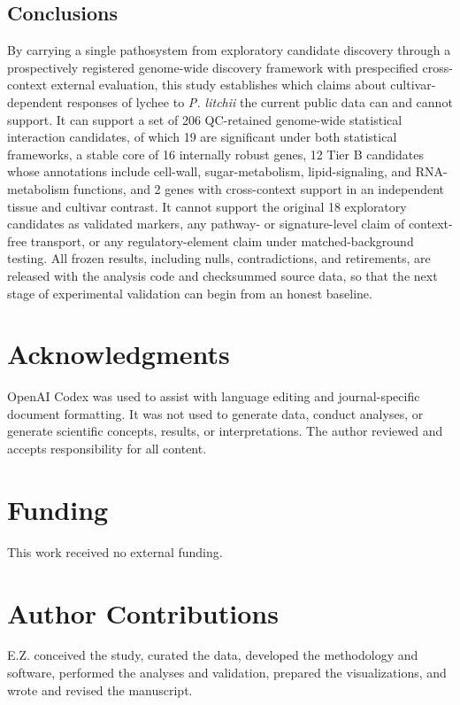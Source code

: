 \documentclass[12pt,letterpaper]{article}
\begin{document}
\subsection*{Conclusions}

By carrying a single pathosystem from exploratory candidate discovery through a prospectively registered genome-wide discovery framework with prespecified cross-context external evaluation, this study establishes which claims about cultivar-dependent responses of lychee to \textit{P. litchii} the current public data can and cannot support. It can support a set of 206 QC-retained genome-wide statistical interaction candidates, of which 19 are significant under both statistical frameworks, a stable core of 16 internally robust genes, 12 Tier B candidates whose annotations include cell-wall, sugar-metabolism, lipid-signaling, and RNA-metabolism functions, and 2 genes with cross-context support in an independent tissue and cultivar contrast. It cannot support the original 18 exploratory candidates as validated markers, any pathway- or signature-level claim of context-free transport, or any regulatory-element claim under matched-background testing. All frozen results, including nulls, contradictions, and retirements, are released with the analysis code and checksummed source data, so that the next stage of experimental validation can begin from an honest baseline.

\section*{Acknowledgments}

OpenAI Codex was used to assist with language editing and journal-specific document formatting. It was not used to generate data, conduct analyses, or generate scientific concepts, results, or interpretations. The author reviewed and accepts responsibility for all content.

\section*{Funding}

This work received no external funding.

\section*{Author Contributions}

E.Z. conceived the study, curated the data, developed the methodology and software, performed the analyses and validation, prepared the visualizations, and wrote and revised the manuscript.
\end{document}
